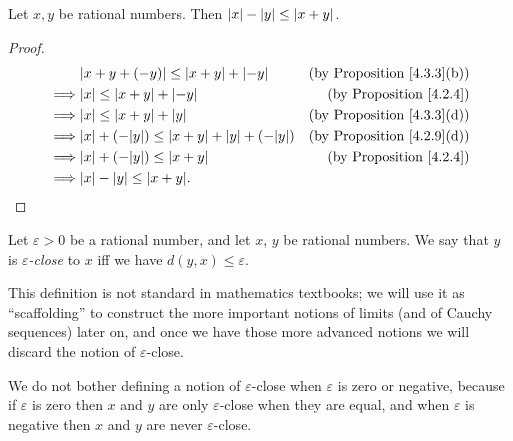 \begin{additional corollary}\label{ac 4.3.1}
Let \(x, y\) be rational numbers.
Then \(\abs*{x} - \abs*{y} \leq \abs*{x + y}\).
\end{additional corollary}

\begin{proof}
    \begin{align*}
                 & \abs*{x + y + (-y)} \leq \abs*{x + y} + \abs*{-y}                 & \text{(by Proposition \ref{4.3.3}(b))} \\
        \implies & \abs*{x} \leq \abs*{x + y} + \abs*{-y}                            & \text{(by Proposition \ref{4.2.4})}    \\
        \implies & \abs*{x} \leq \abs*{x + y} + \abs*{y}                             & \text{(by Proposition \ref{4.3.3}(d))} \\
        \implies & \abs*{x} + (-\abs*{y}) \leq \abs*{x + y} + \abs*{y} + (-\abs*{y}) & \text{(by Proposition \ref{4.2.9}(d))} \\
        \implies & \abs*{x} + (-\abs*{y}) \leq \abs*{x + y}                          & \text{(by Proposition \ref{4.2.4})}    \\
        \implies & \abs*{x} - \abs*{y} \leq \abs*{x + y}.
    \end{align*}
\end{proof}

\begin{definition}\label{4.3.4}
    Let \(\varepsilon > 0\) be a rational number, and let \(x\), \(y\) be rational numbers.
    We say that \(y\) is \emph{\(\varepsilon\)-close} to \(x\) iff we have \(d(y, x) \leq \varepsilon\).
\end{definition}

\begin{remark}\label{4.3.5}
    This definition is not standard in mathematics textbooks;
    we will use it as ``scaffolding'' to construct the more important notions of limits (and of Cauchy sequences) later on, and once we have those more advanced notions we will discard the notion of \(\varepsilon\)-close.
\end{remark}

\begin{note}
    We do not bother defining a notion of \(\varepsilon\)-close when \(\varepsilon\) is zero or negative, because if \(\varepsilon\) is zero then \(x\) and \(y\) are only \(\varepsilon\)-close when they are equal, and when \(\varepsilon\) is negative then \(x\) and \(y\) are never \(\varepsilon\)-close.
\end{note}

